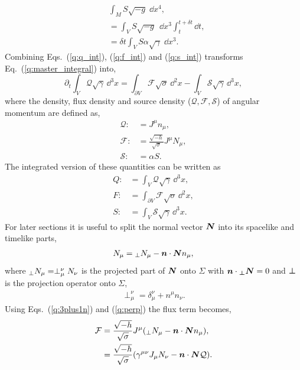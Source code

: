 \begin{align}
&\int_{M} S \sqrt{-g} \;\dd x^4 , \nonumber \\
&=\int_V S \sqrt{-g} \;\,\dd x^3 \int_t^{t+\delta t} \dd t,\\
 \label{q:s_int}&=\delta t \int_V S \alpha\sqrt{\gamma} \;\dd x^3 .
\end{align}
Combining Eqs.~(\ref{q:q_int}), (\ref{q:f_int}) and (\ref{q:s_int}) transforms Eq.~(\ref{q:master_integral}) into,
\begin{equation} \label{q:qfs_system}
\partial_t \int_{V} \mathcal{Q} \sqrt{\gamma} \,\dd^3 x  = \int_{\partial V} \mathcal{F} \sqrt{\sigma} \,\dd^2 x
 - \int_{V} \mathcal{S} \sqrt{\gamma} \,\dd^3 x,
\end{equation}
where the density, flux density and source density ($\mathcal{Q}, \mathcal{F}, \mathcal{S}$) of angular momentum are defined as,
\begin{align}
\label{q:q_def}\mathcal{Q} :&= J^\mu n_\mu , \\
\label{q:flux_def}\mathcal{F} :&= \frac{\sqrt{-h}}{\sqrt{\sigma}}J^\mu N_\mu , \\
\label{q:source_def}\mathcal{S} :&= \alpha S.
\end{align}
The integrated version of these quantities can be written as
\begin{align}
\label{q:eq:Q_def_int}{Q} :&= \int_V \mathcal{Q}\sqrt{\gamma}\,\dd^3 x , \\
\label{q:eq:F_def_int}{F} :&= \int_{\partial V}  \mathcal{F}\sqrt{\sigma}\,\dd^2 x , \\
\label{q:eq:S_def_int}{S} :&= \int_V \mathcal{S}\sqrt{\gamma}\,\dd^3 x.
\end{align}
For later sections it is useful to split the normal vector $\boldsymbol{N}$ into its spacelike and timelike parts,
\begin{align}
\label{q:3plus1n}N_\mu = {}_{\perp}N_\mu - \boldsymbol{n} \cdot \boldsymbol{N} n_\mu,
\end{align}
where ${}_{\perp}N_\mu = \perp^\nu_\mu N_\nu$ is the projected part of $\boldsymbol{N}$ onto $\Sigma$ with $\boldsymbol{n}\cdot \boldsymbol{{}_{\perp}N}=0$ and $\boldsymbol{\perp}$ is the projection operator onto $\Sigma$,
\begin{align}
\label{q:perp} \perp^\nu_\mu = \delta^\nu_\mu + n^\mu n_\nu.
\end{align}
Using Eqs.~(\ref{q:3plus1n}) and (\ref{q:perp}) the flux term becomes,
\begin{align}
\mathcal{F} &= \frac{\sqrt{-h}}{\sqrt{\sigma}}J^\mu ({}_{\perp}N_\mu - \boldsymbol{n} \cdot \boldsymbol{N} n_\mu), \\
  \label{q:3plus1f} &= \frac{\sqrt{-h}}{\sqrt{\sigma}} (\gamma^{\mu\nu} J_\mu N_\nu - \boldsymbol{n} \cdot \boldsymbol{N} \mathcal{Q}).
\end{align}

